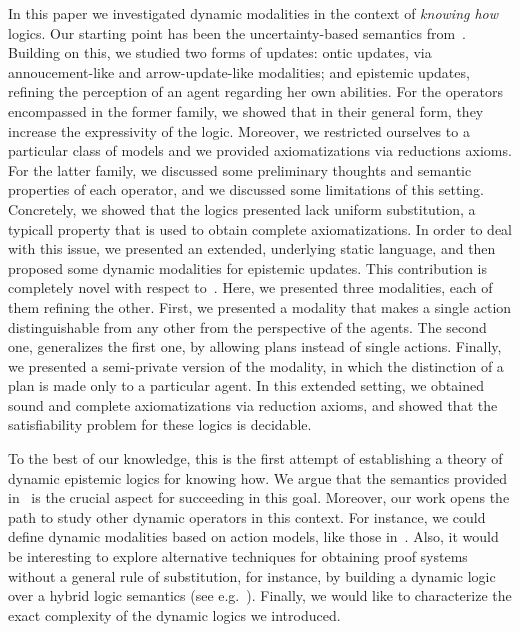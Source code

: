 In this paper we investigated dynamic modalities in the context of \emph{knowing how} logics. Our starting point has been the uncertainty-based semantics from~\cite{AFSVQ21,AFSVQ23report}. 
Building on this, we studied two forms of updates: ontic updates, via annoucement-like and arrow-update-like modalities; and epistemic updates, refining the perception of an agent regarding her own abilities. For the operators encompassed in the former family, we showed that in their general form, they increase the expressivity of the logic. Moreover, we restricted ourselves to a particular class of models and we provided axiomatizations via reductions axioms. For the latter family, we discussed some preliminary thoughts and semantic properties of each operator, and we discussed some limitations of this setting. Concretely, we showed that the logics presented lack uniform substitution, a typicall property that is used to obtain complete axiomatizations. In order to deal with this issue, we presented an extended, underlying static language, and then proposed some dynamic modalities for epistemic updates. This contribution is completely novel with respect to~\cite{AFSV22}. Here, we presented three modalities, each of them refining the other. First, we presented a modality that makes a single action distinguishable from any other from the perspective of the agents. The second one, generalizes the first one, by allowing plans instead of single actions. Finally, we presented a semi-private version of the modality, in which the distinction of a plan is made only to a particular agent. In this extended setting, we obtained sound and complete axiomatizations via reduction axioms, and showed that the satisfiability problem for these logics is decidable.

To the best of our knowledge, this is the first attempt of establishing a theory of dynamic epistemic logics for knowing how. We argue that the semantics provided in~\cite{AFSVQ21,AFSVQ23report} is the crucial aspect for succeeding in this goal. Moreover, our work opens the path to study other dynamic operators in this context. For instance, we could define dynamic modalities based on action models, like those in~\cite{BaltagMS98,DELbook,GalimullinA22}. 
Also, it would be interesting to explore alternative techniques for obtaining proof systems without a general rule of substitution, for instance, by building a dynamic logic over a hybrid logic semantics (see e.g.~\cite{BenthemMZ2022}). Finally, we would like to characterize the exact complexity of the dynamic logics we introduced.
